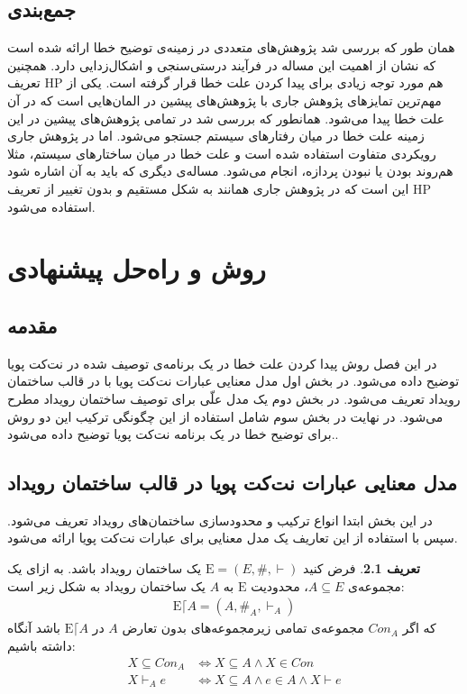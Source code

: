 \documentclass[
msc,
irfonts
]{./tex/tehran-thesis}
\newcommand{\پ}{پروژه/پایان‌نامه/رساله }
\theoremstyle{definition}
\newtheorem{definition}{تعریف}[section]
\theoremstyle{theorem}
\theoremstyle{definition}
\numberwithin{algorithm}{chapter}
\newcommand{\mr}[1]{\mathrm{#1}}
\newcommand{\lf}[1]{\LTRfootnote{#1}}
\begin{document}
\section{جمع‌بندی}
همان طور که بررسی شد پژوهش‌های متعددی در زمینه‌ی توضیح خطا ارائه شده است که نشان از اهمیت این مساله در فرآیند درستی‌سنجی و اشکال‌زدایی دارد.
همچنین تعریف 
HP
هم مورد توجه زیادی برای پیدا کردن علت خطا قرار گرفته است.
یکی از مهم‌ترین تمایز‌های پژوهش جاری با پژوهش‌های پیشین در المان‌هایی است که در آن علت خطا پیدا می‌شود. 
همانطور که بررسی شد در تمامی پژوهش‌های پیشین در این زمینه علت خطا در میان رفتارهای سیستم جستجو می‌شود. 
اما در پژوهش جاری رویکردی متفاوت استفاده شده است و علت خطا در میان ساختار‌های سیستم، مثلا هم‌روند بودن یا نبودن پردازه، انجام می‌شود.
مساله‌ی دیگری که باید به آن اشاره شود این است که در پژوهش جاری همانند
\cite{chockler,Chockler_Halpern_Kupferman_2008}
به شکل مستقیم و بدون تغییر از تعریف 
HP
استفاده می‌شود.\clearpage{}
\clearpage{}\chapter{روش و راه‌حل پیشنهادی}
\section{مقدمه}
در این فصل روش پیدا کردن علت خطا در یک برنامه‌ی توصیف شده در نت‌کت پویا توضیح داده می‌شود.
در بخش اول مدل معنایی عبارات نت‌کت پویا با در قالب ساختمان رویداد تعریف می‌شود.
در بخش دوم یک مدل علّی برای توصیف ساختمان رویداد مطرح می‌شود.
در نهایت در بخش سوم شامل استفاده از این چگونگی ترکیب این دو روش برای توضیح خطا در یک برنامه نت‌کت پویا توضیح داده می‌شود..


\section{مدل معنایی عبارات نت‌کت پویا در قالب ساختمان رویداد}
در این بخش ابتدا انواع ترکیب و محدود‌سازی ساختمان‌‌های رویداد تعریف می‌شود.
سپس با استفاده از این تعاریف  یک مدل معنایی برای عبارات نت‌کت پویا ارائه می‌شود.

\begin{definition}
    فرض کنید
    $\mr{E} = (E,\#,\vdash)$
    یک ساختمان رویداد باشد.
    به ازای یک مجموعه‌ی
    $A \subseteq E$،
    محدودیت\lf{Restriction}
    $\mr{E}$
    به
    $A$
    یک ساختمان رویداد به شکل زیر است:
    \begin{align*}
        \mr{E} \lceil A = (A,\#_A,\vdash_A)
    \end{align*}
    که اگر
    $Con_A$
    مجموعه‌ی تمامی زیرمجموعه‌های بدون تعارض
    $A$
    در
    $\mr{E}\lceil A$
    باشد آنگاه داشته باشیم:
    \begin{align*}
        X \subseteq Con_A & \iff X \subseteq A \wedge X \in Con                 \\
        X \vdash_A e      & \iff X \subseteq A \wedge e \in A \wedge X \vdash e
    \end{align*}
\end{definition}
\end{document}
